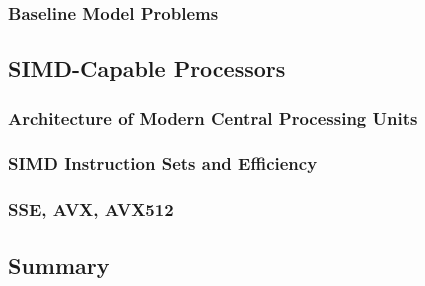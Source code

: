 \documentclass{stdlocal}
\begin{document}

    \subsubsection*{Baseline Model Problems} %
    \label{ssub:baseline_model_problems}


  \subsection{SIMD-Capable Processors} %
  \label{sub:simd-capable_processors}
    \subsubsection*{Architecture of Modern Central Processing Units} %
    \label{ssub:architecture_of_modern_central_processing_units}


    \subsubsection*{SIMD Instruction Sets and Efficiency} %
    \label{ssub:simd_instruction_sets_and_efficiency}


    \subsubsection*{SSE, AVX, AVX512} %
    \label{ssub:sse_avx_avx512}


  \subsection{Summary} %
  \label{sub:summary}

    \textcite{volchan2002,kneusel2018}

\end{document}
